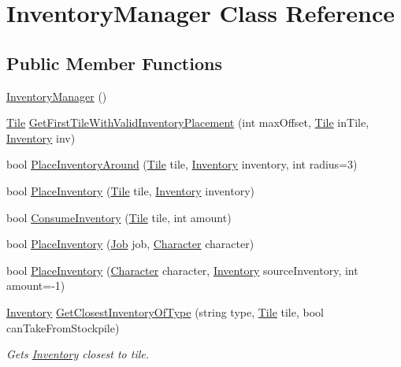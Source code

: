 \hypertarget{class_inventory_manager}{}\section{Inventory\+Manager Class Reference}
\label{class_inventory_manager}
\subsection*{Public Member Functions}
\begin{DoxyCompactItemize}
\item 
\hyperlink{class_inventory_manager_a76f6f27a62942c1ca5017b0f258b2c72}{Inventory\+Manager} ()
\item 
\hyperlink{class_tile}{Tile} \hyperlink{class_inventory_manager_a6d34cf9b8bc2a3b072bb25fe38cce5c4}{Get\+First\+Tile\+With\+Valid\+Inventory\+Placement} (int max\+Offset, \hyperlink{class_tile}{Tile} in\+Tile, \hyperlink{class_inventory}{Inventory} inv)
\item 
bool \hyperlink{class_inventory_manager_ab743fa49734d3219b58bb119ba2bd50b}{Place\+Inventory\+Around} (\hyperlink{class_tile}{Tile} tile, \hyperlink{class_inventory}{Inventory} inventory, int radius=3)
\item 
bool \hyperlink{class_inventory_manager_a85ce56c9efe7339983b7c0a672cab69f}{Place\+Inventory} (\hyperlink{class_tile}{Tile} tile, \hyperlink{class_inventory}{Inventory} inventory)
\item 
bool \hyperlink{class_inventory_manager_ac1aaa01a96f1c3c35683c3ce03663380}{Consume\+Inventory} (\hyperlink{class_tile}{Tile} tile, int amount)
\item 
bool \hyperlink{class_inventory_manager_ab856572ce77ff10df2023df85e70a903}{Place\+Inventory} (\hyperlink{class_job}{Job} job, \hyperlink{class_project_porcupine_1_1_entities_1_1_character}{Character} character)
\item 
bool \hyperlink{class_inventory_manager_a03c111fd95443a2874da2a82b68d89bc}{Place\+Inventory} (\hyperlink{class_project_porcupine_1_1_entities_1_1_character}{Character} character, \hyperlink{class_inventory}{Inventory} source\+Inventory, int amount=-\/1)
\item 
\hyperlink{class_inventory}{Inventory} \hyperlink{class_inventory_manager_a52c2a902e6f16c262df4e046ddd74755}{Get\+Closest\+Inventory\+Of\+Type} (string type, \hyperlink{class_tile}{Tile} tile, bool can\+Take\+From\+Stockpile)
\begin{DoxyCompactList}\small\item\em Gets \hyperlink{class_inventory}{Inventory} closest to tile. \end{DoxyCompactList}\item 

\end{DoxyCompactItemize}
